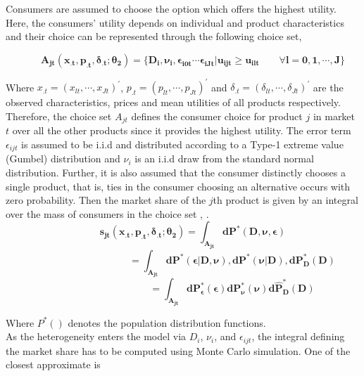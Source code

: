 \documentclass[a4paper,11pt]{article}
\begin{document}
    Consumers are assumed to choose the option which offers the highest utility. Here, the consumers' utility depends on individual and product characteristics and their choice can be represented through the following choice set,

    \begin{equation*}
        \qquad \mathbf{A_{jt}(x_{.t},p_{.t},\delta_{.t};\theta_{2}) = \{ D_{i}, \nu_{i}, \epsilon_{i0t} \cdots \epsilon_{iJt} | u_{ijt} \ge u_{ilt} \qquad\forall l = 0,1,\cdots ,J\}}
    \end{equation*}

    Where $x_{.t} = (x_{lt},\cdots,x_{Jt})^{\prime}$, $p_{.t} = (p_{lt}, \cdots,p_{Jt})^{\prime}$ and $\delta_{.t} = (\delta_{lt}, \cdots, \delta_{Jt})^{\prime}$ are the observed characteristics, prices and mean utilities of all products respectively. Therefore, the choice set $A_{jt}$ defines the consumer choice for product $j$ in market $t$ over all the other products since it provides the highest utility. The error term $\epsilon_{ijt}$ is assumed to be i.i.d and distributed according to a Type-1 extreme value (Gumbel) distribution and $\nu_{i}$ is an i.i.d draw from the standard normal distribution. Further, it is also assumed that the consumer distinctly chooses a single product, that is, ties in the consumer choosing an alternative occurs with zero probability. Then the market share of the $j$th product is given by an integral over the mass of consumers in the choice set \cite{Nevo}, \cite{BerryandHaile}.\\

    \begin{equation*}
        \qquad \mathbf{s_{jt}(x_{.t},p_{.t},\delta_{.t};\theta_{2}) = \int_{A_{jt}} dP^{*}(D,\nu,\epsilon)}
    \end{equation*}
    \begin{equation*}
        \qquad \qquad \qquad \qquad \qquad \mathbf{= \int_{A_{jt}} dP^{*}(\epsilon|D,\nu), dP^{*}(\nu|D), dP_{D}^{*}(D)}
    \end{equation*}
    \begin{equation*}
        \qquad \qquad \qquad \qquad \qquad \mathbf{= \int_{A_{jt}} dP_{\epsilon}^{*}(\epsilon) dP_{\nu}^{*}(\nu) d \hat{P}_{D}^{*}(D)}
    \end{equation*}

    Where $P^{*}()$ denotes the population distribution functions.\\
    
    As the heterogeneity enters the model via $D_{i}$, $\nu_{i}$, and $\epsilon_{ijt}$, the integral defining the market share has to be computed using Monte Carlo simulation. One of the closest approximate is
\end{document}
